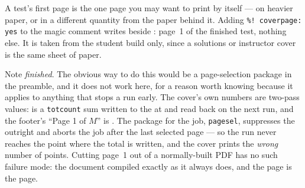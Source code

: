 A test's first page is the one page you may want to print by itself --- on
heavier paper, or in a different quantity from the paper behind it. Adding
\texttt{\%! coverpage: yes} to the magic comment writes
 beside : page~1 of the finished
test, nothing else. It is taken from the student build only, since a
solutions or instructor cover is the same sheet of paper.

Note \emph{finished}. The obvious way to do this would be a page-selection
package in the preamble, and it does not work here, for a reason worth
knowing because it applies to anything that stops a run early. The cover's
own numbers are two-pass values:  is a
\texttt{totcount} sum written to the  at  and
read back on the next run, and the footer's ``Page 1 of $M$'' is
. The package for the job, \texttt{pagesel},
suppresses the  outright and aborts the job after the last
selected page --- so the run never reaches the point where the total is
written, and the cover prints the \emph{wrong} number of points. Cutting
page~1 out of a normally-built PDF has no such failure mode: the document
compiled exactly as it always does, and the page is the page.
